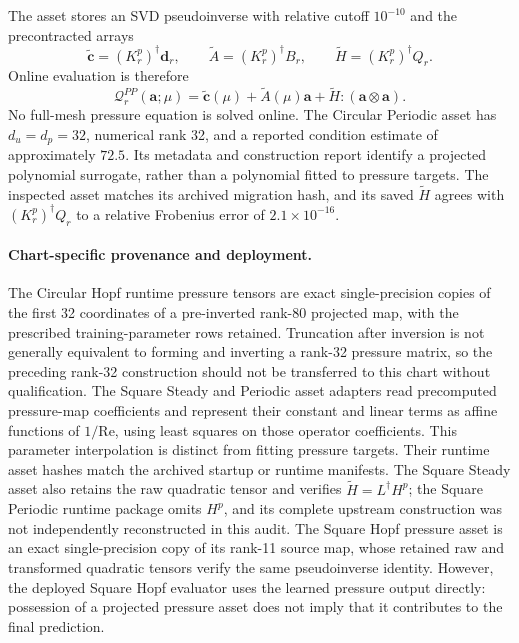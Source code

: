 The asset stores an SVD pseudoinverse with relative cutoff $10^{-10}$ and the precontracted arrays
\begin{equation}
 \widetilde{\bm c}=(K_r^p)^\dagger\bm d_r,\qquad
 \widetilde A=(K_r^p)^\dagger B_r,\qquad
 \widetilde H=(K_r^p)^\dagger Q_r.
\end{equation}
Online evaluation is therefore
\begin{equation}
 \mathcal Q_r^{PP}(\bm a;\mu)
 =\widetilde{\bm c}(\mu)+\widetilde A(\mu)\bm a+
   \widetilde H:(\bm a\otimes\bm a).
 \label{eq:app_pressure_poisson_map}
\end{equation}
No full-mesh pressure equation is solved online. The Circular Periodic asset has $d_u=d_p=32$, numerical rank 32, and a reported condition estimate of approximately $72.5$. Its metadata and construction report identify a projected polynomial surrogate, rather than a polynomial fitted to pressure targets. The inspected asset matches its archived migration hash, and its saved $\widetilde H$ agrees with $(K_r^p)^\dagger Q_r$ to a relative Frobenius error of $2.1\times10^{-16}$.

\paragraph{Chart-specific provenance and deployment.}
The Circular Hopf runtime pressure tensors are exact single-precision copies of the first 32 coordinates of a pre-inverted rank-80 projected map, with the prescribed training-parameter rows retained. Truncation after inversion is not generally equivalent to forming and inverting a rank-32 pressure matrix, so the preceding rank-32 construction should not be transferred to this chart without qualification.
The Square Steady and Periodic asset adapters read precomputed pressure-map coefficients and represent their constant and linear terms as affine functions of $1/\mathrm{Re}$, using least squares on those operator coefficients. This parameter interpolation is distinct from fitting pressure targets. Their runtime asset hashes match the archived startup or runtime manifests. The Square Steady asset also retains the raw quadratic tensor and verifies $\widetilde H=L^\dagger H^p$; the Square Periodic runtime package omits $H^p$, and its complete upstream construction was not independently reconstructed in this audit.
The Square Hopf pressure asset is an exact single-precision copy of its rank-11 source map, whose retained raw and transformed quadratic tensors verify the same pseudoinverse identity. However, the deployed Square Hopf evaluator uses the learned pressure output directly: possession of a projected pressure asset does not imply that it contributes to the final prediction.

